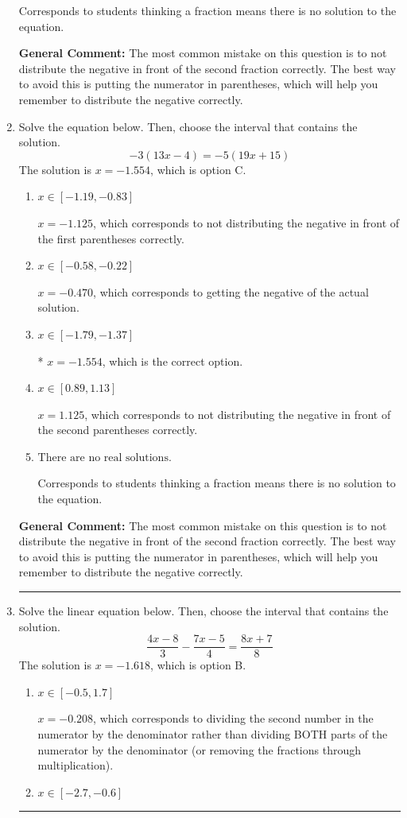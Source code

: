\documentclass{extbook}[14pt]
\newcommand{\litem}[1]{\item #1

\rule{\textwidth}{0.4pt}}
\begin{document}
\begin{enumerate}
{\begin{enumerate}[label=\Alph*.]
Corresponds to students thinking a fraction means there is no solution to the equation.
\end{enumerate}

\textbf{General Comment:} The most common mistake on this question is to not distribute the negative in front of the second fraction correctly. The best way to avoid this is putting the numerator in parentheses, which will help you remember to distribute the negative correctly.
}
\litem{
Solve the equation below. Then, choose the interval that contains the solution.
\[ -3(13x -4) = -5(19x + 15) \]
The solution is \( x = -1.554 \), which is option C.\begin{enumerate}[label=\Alph*.]
\item \( x \in [-1.19, -0.83] \)

$x = -1.125$, which corresponds to not distributing the negative in front of the first parentheses correctly.
\item \( x \in [-0.58, -0.22] \)

$x = -0.470$, which corresponds to getting the negative of the actual solution.
\item \( x \in [-1.79, -1.37] \)

* $x = -1.554$, which is the correct option.
\item \( x \in [0.89, 1.13] \)

$x = 1.125$, which corresponds to not distributing the negative in front of the second parentheses correctly.
\item \( \text{There are no real solutions.} \)

Corresponds to students thinking a fraction means there is no solution to the equation.
\end{enumerate}

\textbf{General Comment:} The most common mistake on this question is to not distribute the negative in front of the second fraction correctly. The best way to avoid this is putting the numerator in parentheses, which will help you remember to distribute the negative correctly.
}
\litem{
Solve the linear equation below. Then, choose the interval that contains the solution.
\[ \frac{4x -8}{3} - \frac{7x -5}{4} = \frac{8x + 7}{8} \]
The solution is \( x = -1.618 \), which is option B.\begin{enumerate}[label=\Alph*.]
\item \( x \in [-0.5, 1.7] \)

 $x = -0.208$, which corresponds to dividing the second number in the numerator by the denominator rather than dividing BOTH parts of the numerator by the denominator (or removing the fractions through multiplication).
\item \( x \in [-2.7, -0.6] \)


\end{enumerate}}
\end{enumerate}
\end{document}
